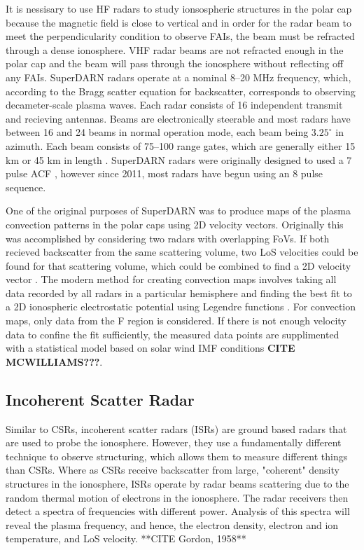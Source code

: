 It is nessisary to use HF radars to study ionsospheric structures in the polar cap because the magnetic field is close to vertical and in order for the radar beam to meet the perpendicularity condition to observe FAIs, the beam must be refracted through a dense ionosphere.  VHF radar beams are not refracted enough in the polar cap and the beam will pass through the ionosphere without reflecting off any FAIs.  SuperDARN radars operate at a nominal 8--20 MHz frequency, which, according to the Bragg scatter equation for backscatter, corresponds to observing decameter-scale plasma waves.  Each radar consists of 16 independent transmit and recieving antennas.  Beams are electronically steerable and most radars have between 16 and 24 beams in normal operation mode, each beam being \(3.25^\circ\) in azimuth.  Each beam consists of 75--100 range gates, which are generally either 15 km or 45 km in length \citep{Chisham2007}.  SuperDARN radars were originally designed to used a 7 pulse ACF \citep{Farley1972,Greenwald1983,Greenwald1985}, however since 2011, most radars have begun using an 8 pulse sequence.

One of the original purposes of SuperDARN was to produce maps of the plasma convection patterns in the polar caps using 2D velocity vectors.  Originally this was accomplished by considering two radars with overlapping FoVs.  If both recieved backscatter from the same scattering volume, two LoS velocities could be found for that scattering volume, which could be combined to find a 2D velocity vector \citep{Ruohoniemi1989}.  The modern method for creating convection maps involves taking all data recorded by all radars in a particular hemisphere and finding the best fit to a 2D ionospheric electrostatic potential using Legendre functions \citep{Ruohonomiemi1998}.  For convection maps, only data from the F region is considered.  If there is not enough velocity data to confine the fit sufficiently, the measured data points are supplimented with a statistical model based on solar wind IMF conditions \textbf{CITE MCWILLIAMS???}.


\subsection{Incoherent Scatter Radar}
\label{sec:isr}
Similar to CSRs, incoherent scatter radars (ISRs) are ground based radars that are used to probe the ionosphere.  However, they use a fundamentally different technique to observe structuring, which allows them to measure different things than CSRs.  Where as CSRs receive backscatter from large, "coherent" density structures in the ionosphere, ISRs operate by radar beams scattering due to the random thermal motion of electrons in the ionosphere.  The radar receivers then detect a spectra of frequencies with different power.  Analysis of this spectra will reveal the plasma frequency, and hence, the electron density, electron and ion temperature, and LoS velocity.
**CITE Gordon, 1958**

